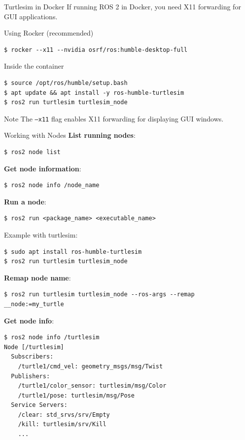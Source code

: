 \begin{frame}[fragile]{Turtlesim in Docker}
    If running ROS 2 in Docker, you need X11 forwarding for GUI applications.

    \begin{block}{Using Rocker (recommended)}
        \begin{lstlisting}[language=shell]
$ rocker --x11 --nvidia osrf/ros:humble-desktop-full
\end{lstlisting}
    \end{block}

    \begin{block}{Inside the container}
        \begin{lstlisting}[language=shell]
$ source /opt/ros/humble/setup.bash
$ apt update && apt install -y ros-humble-turtlesim
$ ros2 run turtlesim turtlesim_node
\end{lstlisting}
    \end{block}

    \begin{alertblock}{Note}
        The \texttt{--x11} flag enables X11 forwarding for displaying GUI windows.
    \end{alertblock}
\end{frame}

\begin{frame}{Working with Nodes}
    \textbf{List running nodes}:
    \begin{lstlisting}[language=shell]
$ ros2 node list
\end{lstlisting}

    \textbf{Get node information}:
    \begin{lstlisting}[language=shell]
$ ros2 node info /node_name
\end{lstlisting}

    \textbf{Run a node}:
    \begin{lstlisting}[language=shell]
$ ros2 run <package_name> <executable_name>
\end{lstlisting}

    Example with turtlesim:
    \begin{lstlisting}[language=shell]
$ sudo apt install ros-humble-turtlesim
$ ros2 run turtlesim turtlesim_node
\end{lstlisting}

    \framebreak

    \textbf{Remap node name}:
    \begin{lstlisting}[language=shell]
$ ros2 run turtlesim turtlesim_node --ros-args --remap __node:=my_turtle
\end{lstlisting}

    \textbf{Get node info}:
    \begin{lstlisting}[language=shell]
$ ros2 node info /turtlesim
Node [/turtlesim]
  Subscribers:
    /turtle1/cmd_vel: geometry_msgs/msg/Twist
  Publishers:
    /turtle1/color_sensor: turtlesim/msg/Color
    /turtle1/pose: turtlesim/msg/Pose
  Service Servers:
    /clear: std_srvs/srv/Empty
    /kill: turtlesim/srv/Kill
    ...
\end{lstlisting}
\end{frame}

